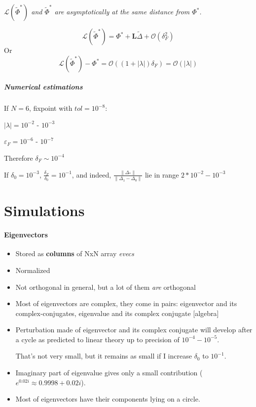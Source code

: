 \documentclass[a4paper,12pt]{article}
\newcommand{\wt}{\widetilde} %
\newcommand{\bigO}{\mathcal{O}}
\newcommand{\FP}{\Phi^*}%
\newcommand{\D}{\Delta}%
\newcommand{\Lmap}{\mathcal{L}} %
\newcommand{\Lmat}{\mathbf{L}}  %
\begin{document}
\textit{$\Lmap(\wt \FP)$ and $\wt \FP$ are asymptotically at the same distance from $\FP$.}

\begin{equation}
\Lmap(\wt \FP) = \FP + \Lmat \wt \D + \mathcal{O}(\delta_F ^2)
\end{equation}
Or
\begin{equation}
\Lmap(\wt \FP) - \FP = \bigO((1 + |\lambda|) \delta_F) = \bigO(|\lambda|)
\end{equation}
\subsubsection{Numerical estimations}

If $N = 6$, fixpoint with $ tol  =10 ^{-8}$:

$|\lambda| = 10 ^ {-2}$ - $10 ^ {-3}$

$\varepsilon_F = 10 ^ {-6}$ - $10^{-7}$

Therefore $\delta_F \sim 10 ^{ -4}$

If $\delta_0 = 10 ^{-3}$, $\frac{ \delta_F } {  \delta_0 } = 10^{-1}$, and indeed,
$ \frac{ \lVert \D_* \rVert }  {\lVert \D_1 - \D_0 \rVert }$ lie in range $2 * 10^{-2} - 10 ^{-3} $




\clearpage
\part*{Simulations}


\subsection{Eigenvectors}

\begin{itemize}

\item Stored as \textbf{columns} of NxN array \textit{evecs}
\item Normalized
\item Not orthogonal in general, but a lot of them \emph{are} orthogonal
\item Most of eigenvectors are complex, they come in pairs: eigenvector and its complex-conjugates, eigenvalue and its complex conjugate [algebra]
\item Perturbation made of eigenvector and its complex conjugate will develop after a cycle as predicted to linear theory up to precision of $10^{-4} - 10^{ -5}$.

 That's not very small, but it remains as small if I increase $\delta_0$ to $10 ^{ -1}$.
 
\item Imaginary part of eigenvalue gives only a small contribution ($e^{0.02 i} \approx 0.9998 + 0.02 i$).
\item Most of eigenvectors have their components lying on a circle.

\end{itemize}
\end{document}
